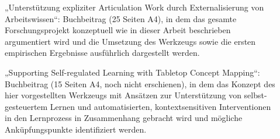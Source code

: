 \begin{description}
	\item[\citet{Oppl10}] „Unterstützung expliziter Articulation Work durch Externalisierung von Arbeitswissen“: Buchbeitrag (25 Seiten A4), in dem das gesamte Forschungsprojekt konzeptuell wie in dieser Arbeit beschrieben argumentiert wird und die Umsetzung des Werkzeugs sowie die ersten empirischen Ergebnisse ausführlich dargestellt werden.
	\item[\cite{Oppl10a}] „Supporting Self-regulated Learning with Tabletop Concept Mapping“: Buchbeitrag (15 Seiten A4, noch nicht erschienen), in dem das Konzept des hier vorgestellten Werkzeugs mit Ansätzen zur Unterstützung von selbst-gesteuertem Lernen und automatisierten, kontextsensitiven Interventionen in den Lernprozess in Zusammenhang gebracht wird und mögliche Anküpfungspunkte identifiziert werden.
\end{description}
